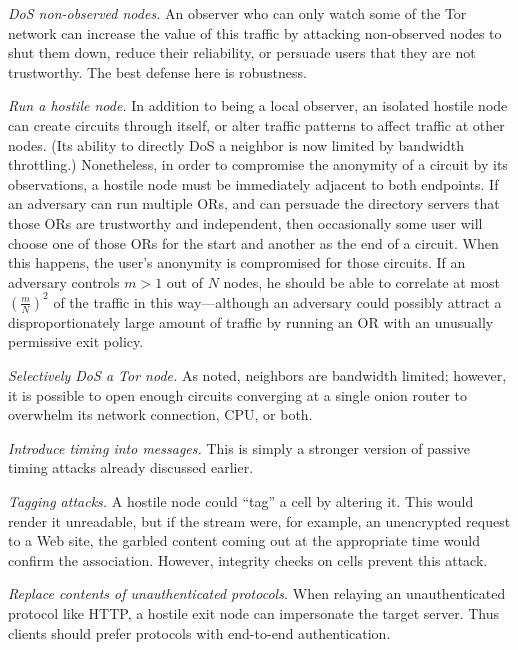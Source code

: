 \documentclass[times,10pt,twocolumn]{article}
\begin{document}
\emph{DoS non-observed nodes.} An observer who can only watch some
of the Tor network can increase the value of this traffic
by attacking non-observed nodes to shut them down, reduce
their reliability, or persuade users that they are not trustworthy.
The best defense here is robustness.
  
\emph{Run a hostile node.}  In addition to being a
local observer, an isolated hostile node can create circuits through
itself, or alter traffic patterns to affect traffic at
other nodes. (Its ability to directly DoS a neighbor is now limited
by bandwidth throttling.) Nonetheless, in order to compromise the
anonymity of a circuit by its observations, a
hostile node must be immediately adjacent to both endpoints.
If an adversary can
run multiple ORs, and can persuade the directory servers
that those ORs are trustworthy and independent, then occasionally
some user will choose one of those ORs for the start and another
as the end of a circuit.  When this happens, the user's
anonymity is compromised for those circuits.  If an adversary
controls $m>1$ out of $N$ nodes, he should be able to correlate at most 
$\left(\frac{m}{N}\right)^2$ of the traffic in this way---although an 
adversary
could possibly attract a disproportionately large amount of traffic
by running an OR with an unusually permissive exit policy.

%
  
\emph{Selectively DoS a Tor node.} As noted, neighbors are
bandwidth limited; however, it is possible to open enough
circuits converging at a single onion router to
overwhelm its network connection, CPU, or both.

\emph{Introduce timing into messages.} This is simply a stronger
version of passive timing attacks already discussed earlier.
  
\emph{Tagging attacks.} A hostile node could ``tag'' a
cell by altering it. This would render it unreadable, but if the
stream were, for example, an unencrypted request to a Web site,
the garbled content coming out at the appropriate time would confirm
the association. However, integrity checks on cells prevent
this attack.

\emph{Replace contents of unauthenticated protocols.}  When
relaying an unauthenticated protocol like HTTP, a hostile exit node 
can impersonate the target server.  Thus clients
should prefer protocols with end-to-end authentication.
\end{document}
